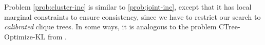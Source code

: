 \documentclass{article}
\begin{document}
Problem \eqref{prob:cluster-inc} is similar to \eqref{prob:joint-inc}, except
that it
has local marginal constraints to ensure consistency, since we have to restrict our search to \emph{calibrated} clique trees.
In some ways, it is analogous to
the problem 
CTree-Optimize-KL from \textcite[pg. 384]{koller2009probabilistic}.
\end{document}
